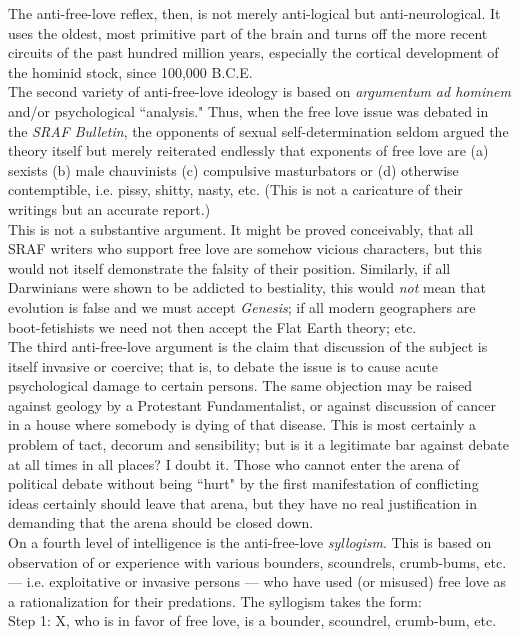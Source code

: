 \documentclass[12pt, onecolumn, letterpaper, oneside]{book}
\begin{document}
The anti-free-love reflex, then, is not merely anti-logical but anti-neurological. It uses the oldest, most primitive part of the brain and turns off the more recent circuits of the past hundred million years, especially the cortical development of the hominid stock, since 100,000 B.C.E.\\
The second variety of anti-free-love ideology is based on \emph{argumentum ad hominem} and/or psychological ``analysis." Thus, when the free love issue was debated in the \emph{SRAF Bulletin}, the opponents of sexual self-determination seldom argued the theory itself but merely reiterated endlessly that exponents of free love are (a) sexists (b) male chauvinists (c) compulsive masturbators or (d) otherwise contemptible, i.e. pissy, shitty, nasty, etc. (This is not a caricature of their writings but an accurate report.)\\
This is not a substantive argument. It might be proved conceivably, that all SRAF writers who support free love are somehow vicious characters, but this would not itself demonstrate the falsity of their position. Similarly, if all Darwinians were shown to be addicted to bestiality, this would \emph{not} mean that evolution is false and we must accept \emph{Genesis}; if all modern geographers are boot-fetishists we need not then accept the Flat Earth theory; etc.\\
The third anti-free-love argument is the claim that discussion of the subject is itself invasive or coercive; that is, to debate the issue is to cause acute psychological damage to certain persons. The same objection may be raised against geology by a Protestant Fundamentalist, or against discussion of cancer in a house where somebody is dying of that disease. This is most certainly a problem of tact, decorum and sensibility; but is it a legitimate bar against debate at all times in all places? I doubt it. Those who cannot enter the arena of political debate without being ``hurt" by the first manifestation of conflicting ideas certainly should leave that arena, but they have no real justification in demanding that the arena should be closed down.\\
On a fourth level of intelligence is the anti-free-love \emph{syllogism}. This is based on observation of or experience with various bounders, scoundrels, crumb-bums, etc. --- i.e. exploitative or invasive persons --- who have used (or misused) free love as a rationalization for their predations. The syllogism takes the form:\\
\indent Step 1: X, who is in favor of free love, is a bounder, scoundrel, crumb-bum, etc.\\
\end{document}

